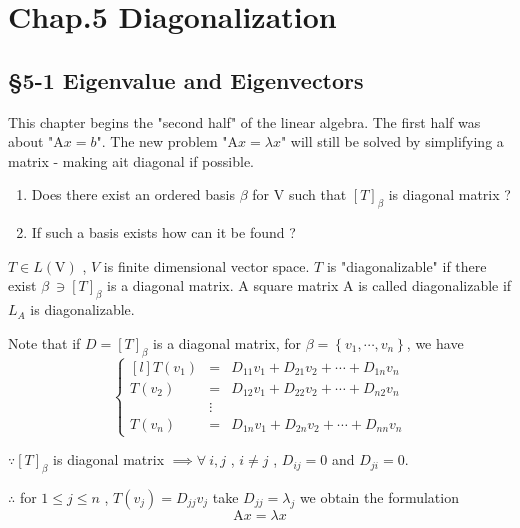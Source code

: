 
\linespread{1.6}

	\section*{Chap.5 Diagonalization}
		\subsection*{\S 5-1 Eigenvalue and Eigenvectors}
		
		
		This chapter begins the "second half" of the linear algebra. The first half was about "$\mathrm{A}x = b$". The new problem "$\mathrm{A}x = \lambda x $" will still be solved by simplifying a matrix - making ait diagonal if possible.
			
			\begin{enumerate}
				\item Does there exist an ordered basis $\beta$ for $\mathrm{V}$ such that $[T]_{\beta}$ is diagonal matrix ?
				\item If such a basis exists how can it be found ?
			\end{enumerate}
		\begin{defn}
			$T\in L(\mathrm{V})$ , $V$ is finite dimensional vector space. $T$ is "diagonalizable" if there exist $\beta~\ni [T]_{\beta}$ is a diagonal matrix. A square matrix $\mathrm{A}$ is called diagonalizable if $L_{A}$ is diagonalizable.  
		\end{defn}
		
		\noindent Note that if $D  = [T]_{\beta}$ is a diagonal matrix, for $\beta = \left\{v_1 , \cdots , v_n \right\}$, we have 
		$$\left\{
		\begin{aligned}[l]
			T(v_1) & = & D_{11}v_1 + D_{21}v_2 + \cdots + D_{1n}v_n\\
			T(v_2) & = & D_{12}v_1 + D_{22}v_2 + \cdots + D_{n2}v_n\\
			& \vdots &\\
			T(v_n) & = & D_{1n}v_1 + D_{2n}v_2 + \cdots +D_{nn}v_n  
		\end{aligned}\right.
		$$
		
		\noindent $\because [T]_{\beta}$ is diagonal matrix $\implies\forall~i,j$ , $ i\neq j$ , $D_{ij}=0$ and $D_{ji}=0$. 
		
		\noindent $\therefore $ for $1\leq j \leq n$ , $T(v_j) = D_{jj}v_j$ take $D_{jj} = \lambda_j$ we obtain the formulation
		$$
		\mathrm{A}x = \lambda x
		$$
		
